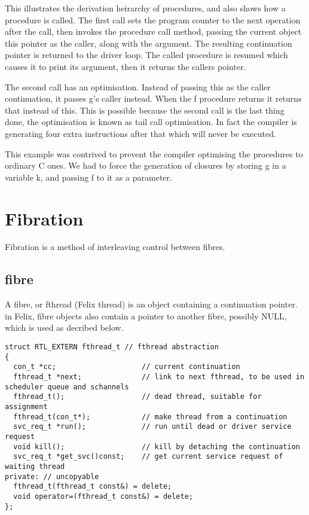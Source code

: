 \documentclass[oneside]{book}
\begin{document}
This illustrates the derivation heirarchy of procedures, and also 
shows how a procedure is called. The first call sets the program
counter to the next operation after the call, then invokes the procedure
call method, passing the current object this pointer as the caller,
along with the argument. The resulting continuation pointer is returned
to the driver loop. The called procedure is resumed which causes it
to print its argument, then it returns the callers pointer.

The second call has an optimisation. Instead of passing this as the
caller continuation, it passes g's caller instead. When the f
procedure returns it returns that instead of this. This is possible
because the second call is the last thing done, the optimisation
is known as tail call optimisation. In fact the compiler is generating
four extra instructions after that which will never be executed.

This example was contrived to prevent the compiler optimising
the procedures to ordinary C ones. We had to force the generation
of closures by storing g in a variable k, and passing f to it
as a parameter.

\section{Fibration}
Fibration is a method of interleaving control between fibres.

\subsection{fibre}
A fibre, or fthread (Felix thread) is an object containing a continuation pointer.
in Felix, fibre objects also contain a pointer to another fibre, possibly NULL,
which is used as decribed below.

\begin{verbatim}
struct RTL_EXTERN fthread_t // fthread abstraction
{
  con_t *cc;                    // current continuation
  fthread_t *next;              // link to next fthread, to be used in scheduler queue and schannels
  fthread_t();                  // dead thread, suitable for assignment
  fthread_t(con_t*);            // make thread from a continuation
  svc_req_t *run();             // run until dead or driver service request
  void kill();                  // kill by detaching the continuation
  svc_req_t *get_svc()const;    // get current service request of waiting thread
private: // uncopyable
  fthread_t(fthread_t const&) = delete;
  void operator=(fthread_t const&) = delete;
};
\end{verbatim}
\end{document}

